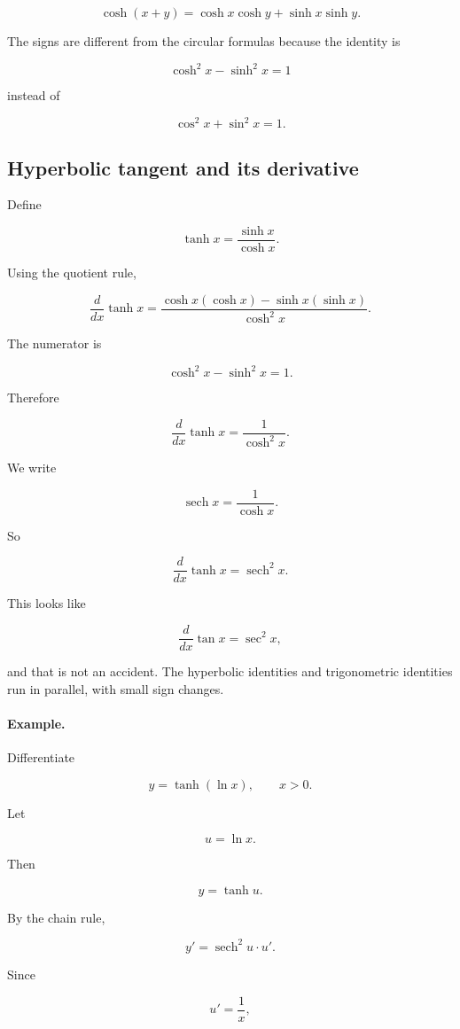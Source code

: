 \[
\boxed{
\cosh(x+y)=\cosh x\cosh y+\sinh x\sinh y.
}
\]

The signs are different from the circular formulas because the identity is

\[
\cosh^2x-\sinh^2x=1
\]

instead of

\[
\cos^2x+\sin^2x=1.
\]

\subsection{Hyperbolic tangent and its derivative}
\label{subsec:hyperbolic-tangent}

Define

\[
\tanh x=\frac{\sinh x}{\cosh x}.
\]

Using the quotient rule,

\[
\frac{d}{dx}\tanh x
=
\frac{\cosh x(\cosh x)-\sinh x(\sinh x)}{\cosh^2x}.
\]

The numerator is

\[
\cosh^2x-\sinh^2x=1.
\]

Therefore

\[
\boxed{
\frac{d}{dx}\tanh x=\frac1{\cosh^2x}.
}
\]

We write

\[
\operatorname{sech}x=\frac1{\cosh x}.
\]

So

\[
\boxed{
\frac{d}{dx}\tanh x=\operatorname{sech}^2x.
}
\]

This looks like

\[
\frac{d}{dx}\tan x=\sec^2x,
\]

and that is not an accident.  The hyperbolic identities and trigonometric identities run in parallel, with small sign changes.

\paragraph{Example.}
Differentiate

\[
y=\tanh(\ln x),
\qquad x>0.
\]

Let

\[
u=\ln x.
\]

Then

\[
y=\tanh u.
\]

By the chain rule,

\[
y'=\operatorname{sech}^2u\cdot u'.
\]

Since

\[
u'=\frac1x,
\]

